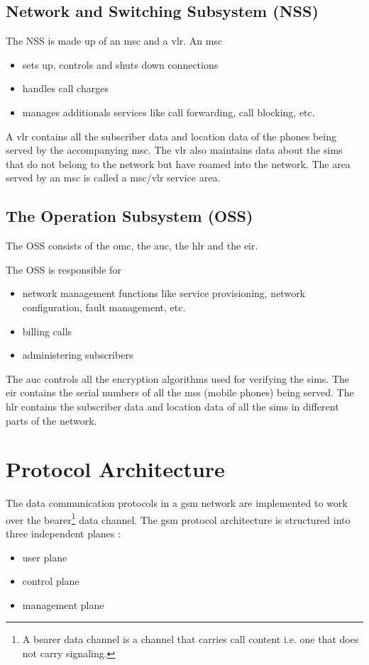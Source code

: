 \subsection{Network and Switching Subsystem (NSS)}

The NSS is made up of an \gls{msc} and a \gls{vlr}. An \gls{msc} 
\begin{itemize}[noitemsep,topsep=0pt,parsep=0pt,partopsep=0pt]
\item sets up, controls and shuts down connections
\item handles call charges
\item manages additionals services like call forwarding, call blocking, etc.
\end{itemize}

A \gls{vlr} contains all the subscriber data and location data of the phones being 
served by the accompanying \gls{msc}. The \gls{vlr} also maintains data about the \glspl{sim} 
that do not belong to the network but have roamed into the network. The area 
served by an \gls{msc} is called a \gls{msc}/\gls{vlr} service area.

\subsection{The Operation Subsystem (OSS)}

The OSS consists of the \gls{omc}, the 
\gls{auc}, the \gls{hlr} and the 
\gls{eir}.

The OSS is responsible for
\begin{itemize}[noitemsep,topsep=0pt,parsep=0pt,partopsep=0pt]
\item network management functions like service provisioning, network 
configuration, fault management, etc.
\item billing calls
\item administering subscribers
\end{itemize}

The \gls{auc} controls all the encryption algorithms used for verifying the \glspl{sim}. 
The \gls{eir} contains the serial numbers of all the \glspl{ms} (mobile phones) being 
served. The \gls{hlr} contains the subscriber data and location data of all the 
\glspl{sim} in different parts of the network.



\section{Protocol Architecture}
The data communication protocols in a \gls{gsm} network are implemented to work over
the bearer\footnote{A bearer data channel is a channel that carries call 
content i.e.
one that does not carry signaling.} data channel. 
The \gls{gsm} protocol architecture is structured into three independent planes \cite{arcadaFi3}:
\begin{itemize}[noitemsep,topsep=0pt,parsep=0pt,partopsep=0pt]
 \item user plane
 \item control plane
 \item management plane
\end{itemize}

